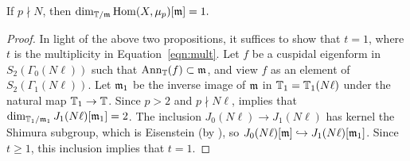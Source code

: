 \documentclass{article} \usepackage[active]{srcltx}
\begin{document}
\begin{theorem}\label{thm:multonet}
If $p\nmid N$, then
$
\dim_{\mathbb{T}/\mathfrak{m}} \operatorname{Hom}(X,\mu_p)[\mathfrak{m}] = 1. 
$
\end{theorem}
\begin{proof}
In light of the above two propositions, it suffices to
show that $t=1$, where $t$ is the multiplicity in Equation~\eqref{eqn:mult}. 
Let $f$ be a cuspidal eigenform in $S_2(\Gamma_0(N\ell))$
such that $\operatorname{Ann}_{\mathbb{T}}(f) \subset \mathfrak{m}$, and view $f$
as an element of $S_2(\Gamma_1(N\ell))$.
Let $\mathfrak{m}_1$ be the inverse image of $\mathfrak{m}$ in $\mathbb{T}_1=\mathbb{T}_1(N\ell)$ under the
natural map $\mathbb{T}_1 \to \mathbb{T}$.
Since $p>2$ and $p\nmid N\ell$, \cite[Th.~9.2, part 1]{edixhoven:weight}
implies that $\dim_{\mathbb{T}_1/\mathfrak{m}_1} J_1(N\ell)[\mathfrak{m}_1] = 2$.
The inclusion $J_0(N\ell) \to J_1(N\ell)$ has kernel
the Shimura subgroup, which is Eisenstein (by \cite[Thm.~1]{ribet:comp}), 
so $J_0(N\ell)[\mathfrak{m}] \hookrightarrow J_1(N\ell)[\mathfrak{m}_1]$.  
Since $t\geq 1$, this inclusion implies that $t=1$.
\end{proof}
   







\end{document}
